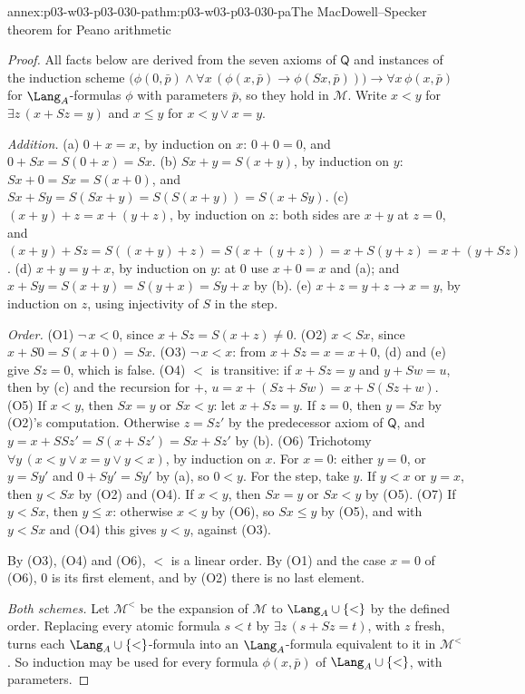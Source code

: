 \begin{annexitem}{annex:p03-w03-p03-030-pa}{thm:p03-w03-p03-030-pa}{The MacDowell--Specker theorem for Peano arithmetic}
\begin{proof}
All facts below are derived from the seven axioms of \(\mathsf Q\) and
instances of the induction scheme
\(\bigl(\phi(0,\bar p)\wedge\forall x\,(\phi(x,\bar p)\rightarrow
\phi(Sx,\bar p))\bigr)\rightarrow\forall x\,\phi(x,\bar p)\) for
\(\Lang_A\)-formulas \(\phi\) with parameters \(\bar p\), so they hold in
\(\mathcal M\).  Write \(x<y\) for
\(\exists z\,(x+Sz=y)\) and \(x\le y\) for \(x<y\vee x=y\).

\emph{Addition.}  (a) \(0+x=x\), by induction on \(x\): \(0+0=0\), and
\(0+Sx=S(0+x)=Sx\).  (b) \(Sx+y=S(x+y)\), by induction on \(y\):
\(Sx+0=Sx=S(x+0)\), and \(Sx+Sy=S(Sx+y)=S(S(x+y))=S(x+Sy)\).  (c)
\((x+y)+z=x+(y+z)\), by induction on \(z\): both sides are \(x+y\) at
\(z=0\), and \((x+y)+Sz=S((x+y)+z)=S(x+(y+z))=x+S(y+z)=x+(y+Sz)\).  (d)
\(x+y=y+x\), by induction on \(y\): at \(0\) use \(x+0=x\) and (a); and
\(x+Sy=S(x+y)=S(y+x)=Sy+x\) by (b).  (e) \(x+z=y+z\rightarrow x=y\), by
induction on \(z\), using injectivity of \(S\) in the step.

\emph{Order.}  (O1) \(\neg\,x<0\), since \(x+Sz=S(x+z)\ne0\).  (O2)
\(x<Sx\), since \(x+S0=S(x+0)=Sx\).  (O3) \(\neg\,x<x\): from \(x+Sz=x=x+0\),
(d) and (e) give \(Sz=0\), which is false.  (O4) \(<\) is transitive: if
\(x+Sz=y\) and \(y+Sw=u\), then by (c) and the recursion for \(+\),
\(u=x+(Sz+Sw)=x+S(Sz+w)\).  (O5) If \(x<y\), then \(Sx=y\) or \(Sx<y\): let
\(x+Sz=y\).  If \(z=0\), then \(y=Sx\) by (O2)'s computation.  Otherwise
\(z=Sz'\) by the predecessor axiom of \(\mathsf Q\), and
\(y=x+SSz'=S(x+Sz')=Sx+Sz'\) by (b).  (O6) Trichotomy
\(\forall y\,(x<y\vee x=y\vee y<x)\), by induction on \(x\).  For \(x=0\):
either \(y=0\), or \(y=Sy'\) and \(0+Sy'=Sy'\) by (a), so \(0<y\).  For the
step, take \(y\).  If \(y<x\) or \(y=x\), then \(y<Sx\) by (O2) and (O4).  If
\(x<y\), then \(Sx=y\) or \(Sx<y\) by (O5).  (O7) If \(y<Sx\), then \(y\le
x\): otherwise \(x<y\) by (O6), so \(Sx\le y\) by (O5), and with \(y<Sx\) and
(O4) this gives \(y<y\), against (O3).

By (O3), (O4) and (O6), \(<\) is a linear order.  By (O1) and the case
\(x=0\) of (O6), \(0\) is its first element, and by (O2) there is no last
element.

\emph{Both schemes.}  Let \(\mathcal M^<\) be the expansion of \(\mathcal M\)
to \(\Lang_A\cup\{<\}\) by the defined order.  Replacing every atomic
formula \(s<t\) by \(\exists z\,(s+Sz=t)\), with \(z\) fresh, turns each
\(\Lang_A\cup\{<\}\)-formula into an \(\Lang_A\)-formula equivalent to it in
\(\mathcal M^<\).  So induction may be used for every formula
\(\phi(x,\bar p)\) of \(\Lang_A\cup\{<\}\), with parameters.


\end{proof}
\end{annexitem}
